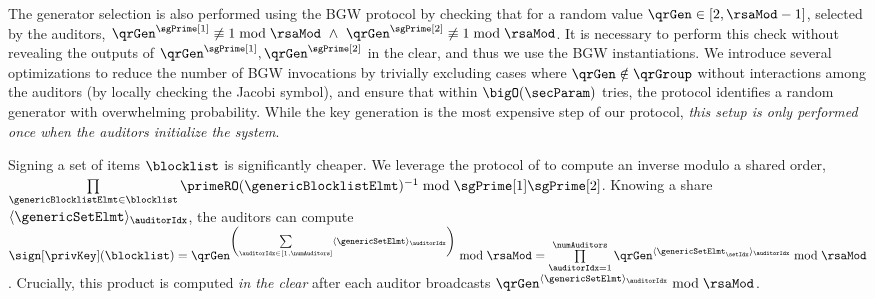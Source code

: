 The generator selection is also performed using the BGW protocol by checking that for a random value $\qrGen \in [2, \rsaMod -1]$, selected by the auditors, $\qrGen^{\sgPrime[1]} \not \equiv 1 \bmod \rsaMod ~\land ~\qrGen^{\sgPrime[2]} \not \equiv 1 \bmod \rsaMod$. 
It is necessary to perform this check without revealing the outputs of   
$\qrGen^{\sgPrime[1]}, \qrGen^{\sgPrime[2]}$ in the clear, and thus we use the BGW instantiations. We introduce several optimizations to reduce the number of BGW invocations by trivially excluding cases where $\qrGen \notin \qrGroup$ without interactions among the auditors (by locally checking the Jacobi symbol), and ensure that within $\bigO(\secParam)$ tries, the protocol identifies a random generator with overwhelming probability. While the key generation is the most expensive step of our protocol, \emph{this setup is only performed once when the auditors initialize the system}.

%
Signing a set of items $\blocklist$ is significantly cheaper.  We leverage the protocol of \citet[Fig. 3]{catalano2000computing} to compute an inverse modulo a shared order, $\prod\limits_{\genericBlocklistElmt \in \blocklist}\primeRO(\genericBlocklistElmt)^{-1} \bmod \sgPrime[1] \sgPrime[2]$. Knowing a share $\langle \genericSetElmt \rangle_{\auditorIdx}$, the auditors can compute $\sign[\privKey](\blocklist) = \qrGen^{\left(\sum\limits_{\auditorIdx \in [1, \numAuditors]}\langle \genericSetElmt \rangle_{\auditorIdx}\right)}\bmod \rsaMod = \prod\limits_{\auditorIdx = 1}^{\numAuditors} \qrGen^{\langle \genericSetElmt_{\setIdx} \rangle_{\auditorIdx}} \bmod \rsaMod$. Crucially, this product is computed \emph{in the clear} after each auditor broadcasts  $\qrGen^{\langle \genericSetElmt \rangle_{\auditorIdx}} \bmod \rsaMod$. 







